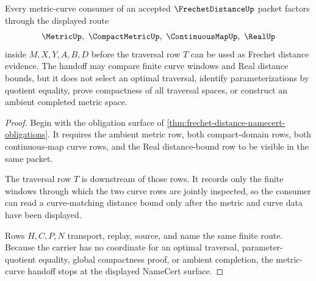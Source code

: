 \begin{theorem}
\label{thm:frechet-distance-metric-curve-handoff}
Every metric-curve consumer of an accepted $\FrechetDistanceUp$ packet factors through the displayed route
$$
\MetricUp,\ \CompactMetricUp,\ \ContinuousMapUp,\ \RealUp
$$
inside $M,X,Y,A,B,D$ before the traversal row $T$ can be used as Frechet distance evidence. The handoff may compare finite curve windows and Real distance bounds, but it does not select an optimal traversal, identify parameterizations by quotient equality, prove compactness of all traversal spaces, or construct an ambient completed metric space.
\end{theorem}
\begin{proof}
Begin with the obligation surface of \autoref{thm:frechet-distance-namecert-obligations}. It requires the ambient metric row, both compact-domain rows, both continuous-map curve rows, and the Real distance-bound row to be visible in the same packet.

The traversal row $T$ is downstream of those rows. It records only the finite windows through which the two curve rows are jointly inspected, so the consumer can read a curve-matching distance bound only after the metric and curve data have been displayed.

Rows $H,C,P,N$ transport, replay, source, and name the same finite route. Because the carrier has no coordinate for an optimal traversal, parameter-quotient equality, global compactness proof, or ambient completion, the metric-curve handoff stops at the displayed NameCert surface.
\end{proof}




